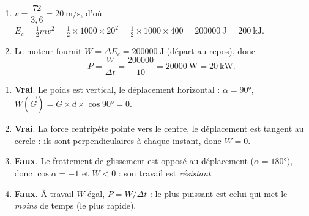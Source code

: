 \documentclass[11pt,a4paper]{article}
\newcommand{\vv}[1]{\vec{#1}}\newcommand{\ds}{\displaystyle}
\begin{document}
\begin{corrige}
\begin{enumerate}[label=\alph*)]
  \item $v=\dfrac{72}{3,6}=\qty{20}{\metre\per\second}$, d'où
        $E_c=\tfrac12 m v^2=\tfrac12\times1000\times20^2=\tfrac12\times1000\times400=\qty{200000}{\joule}=\qty{200}{\kilo\joule}$.
  \item Le moteur fournit $W=\Delta E_c=\qty{200000}{\joule}$ (départ au repos), donc
        \[
        P=\frac{W}{\Delta t}=\frac{200000}{10}=\qty{20000}{\watt}=\qty{20}{\kilo\watt}.
        \]
\end{enumerate}
\end{corrige}

\begin{corrige}
\begin{enumerate}[label=\alph*)]
  \item \textbf{Vrai}. Le poids est vertical, le déplacement horizontal : $\alpha=\ang{90}$,
        $W(\vv G)=G\times d\times\cos\ang{90}=0$.
  \item \textbf{Vrai}. La force centripète pointe vers le centre, le déplacement est tangent au
        cercle : ils sont perpendiculaires à chaque instant, donc $W=0$.
  \item \textbf{Faux}. Le frottement de glissement est opposé au déplacement ($\alpha=\ang{180}$),
        donc $\cos\alpha=-1$ et $W<0$ : son travail est \emph{résistant}.
  \item \textbf{Faux}. À travail $W$ égal, $P=W/\Delta t$ : le plus puissant est celui qui met le
        \emph{moins} de temps (le plus rapide).
\end{enumerate}
\end{corrige}
\end{document}
